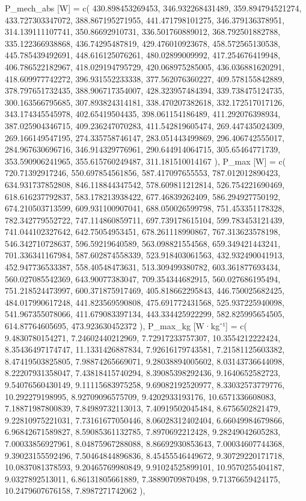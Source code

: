 \documentclass[
  letterpaper,
  DIV=11]{scrartcl}
\newenvironment{Shaded}{\begin{snugshade}}{\end{snugshade}}
\newcommand{\NormalTok}[1]{\textcolor[rgb]{0.00,0.23,0.31}{#1}}
\begin{document}
\begin{Shaded}
\begin{Highlighting}[]
\NormalTok{  \textasciigrave{}P\_mech\_abs [W]\textasciigrave{} = c( 430.898453269453, 346.932268431489, 359.894794521274, 433.727303347072, 388.867195271955, 441.471798101275, 346.379136378951, 314.139111107741, 350.86692910731, 336.501760889012, 368.792501882788, 335.122366938868, 436.74295487819, 429.476010923678, 458.572565130538, 445.785439492691, 448.616125076261, 480.02899009992, 417.254676419948, 406.786522182967, 418.029194795729, 420.068975285005, 436.036881620291, 418.609977742272, 396.931552233338, 377.562076360227, 409.578155842889, 378.797651732435, 388.906717354007, 428.323957484394, 339.738475124735, 300.163566795685, 307.893824314181, 338.470207382618, 332.172517017126, 343.174345545978, 402.65419504435, 398.061154186489, 411.292076398934, 387.025904346715, 409.236247070283, 411.542819605474, 269.447435024309, 269.166149547195, 274.335758746147, 283.051443499869, 296.406742555017, 284.967630696716, 346.914329776961, 290.644914064715, 305.65464771739, 353.590906241965, 355.615760249487, 311.181510014167 ),}
\NormalTok{  \textasciigrave{}P\_max [W]\textasciigrave{} = c( 720.71392917246, 550.697854561856, 587.417097655553, 787.012012890423, 634.931737852808, 846.118844347542, 578.609811212814, 526.754221690469, 618.616237792837, 583.178213938422, 677.46839262409, 586.294927750192, 674.210503713599, 609.931100907041, 688.050026599798, 751.453351178328, 782.342779552722, 747.114860859711, 697.739178615104, 599.783453121439, 741.044102327642, 642.75054953451, 678.261118990867, 767.313623578198, 546.342710728637, 596.59219640589, 563.098821554568, 659.349421443241, 701.336341167984, 587.602874558339, 523.918403061563, 432.932490041913, 452.947736533387, 558.40548473631, 513.309499380782, 603.361877693434, 560.027085542369, 643.90077383047, 709.354344682915, 560.027686195494, 751.218524473997, 600.371875917469, 405.818662295843, 446.750025682425, 484.017990617248, 441.823569590808, 475.691772431568, 525.937225940098, 541.967355078066, 411.679083397134, 443.334425922299, 582.825995654505, 614.87764605695, 473.923630452372 ),}
\NormalTok{  \textasciigrave{}P\_max\_kg [W·kg⁻¹]\textasciigrave{} = c( 9.4830780154271, 7.24602440212969, 7.72917233757307, 10.3554212222424, 8.35436497174747, 11.1331426887834, 7.92616179743581, 7.21581125603382, 8.47419503825805, 7.98874265669071, 9.28038894005602, 8.03143736644098, 8.22207931358047, 7.43818415740294, 8.39085398292436, 9.1640652582723, 9.54076560430149, 9.11115683975258, 9.69082192520977, 8.33032573779776, 10.292279198995, 8.92709096575709, 9.4202933193176, 10.6571336608083, 7.18871987800839, 7.84989732113013, 7.40919502045484, 8.6756502821479, 9.22810975221031, 7.73161677050446, 8.06028312402404, 6.66049984679866, 6.96842671589827, 8.59085361132785, 7.8970692212428, 9.28249042605283, 7.00033856927961, 8.04875967288088, 8.86692930853643, 7.00034607744368, 9.39023155592496, 7.50464844896836, 8.45455546449672, 9.30729220171718, 10.0837081378593, 9.20465769980849, 9.91024525899101, 10.9570255404187, 9.0327892513011, 6.86131805661889, 7.38890709870498, 9.71376659424175, 10.2479607676158, 7.8987271742062 ),}

\end{Highlighting}
\end{Shaded}
\end{document}
